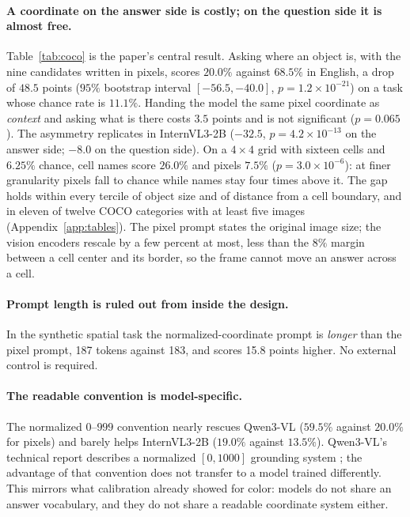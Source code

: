 \documentclass{article}
\begin{document}
\paragraph{A coordinate on the answer side is costly; on the question side it is
almost free.} Table~\ref{tab:coco} is the paper's central result. Asking where an
object is, with the nine candidates written in pixels, scores $20.0\%$ against
$68.5\%$ in English, a drop of $48.5$ points ($95\%$ bootstrap interval $[-56.5,
-40.0]$, $p=1.2\times10^{-21}$) on a task whose chance rate is $11.1\%$. Handing
the model the same pixel coordinate as \emph{context} and asking what is there
costs $3.5$ points and is not significant ($p=0.065$). The asymmetry replicates in
InternVL3-2B ($-32.5$, $p=4.2\times10^{-13}$ on the answer side; $-8.0$ on the
question side). On a $4\times4$ grid with sixteen cells and $6.25\%$ chance, cell
names score $26.0\%$ and pixels $7.5\%$ ($p=3.0\times10^{-6}$): at finer
granularity pixels fall to chance while names stay four times above it. The gap
holds within every tercile of object size and of distance from a cell boundary, and
in eleven of twelve COCO categories with at least five images
(Appendix~\ref{app:tables}). The pixel prompt states the original image size;
the vision encoders rescale by a few percent at most, less than the $8\%$ margin
between a cell center and its border, so the frame cannot move an answer across a
cell.

\paragraph{Prompt length is ruled out from inside the design.} In the synthetic
spatial task the normalized-coordinate prompt is \emph{longer} than the pixel
prompt, 187 tokens against 183, and scores 15.8 points higher. No external
control is required.

\paragraph{The readable convention is model-specific.} The normalized $0$--$999$
convention nearly rescues Qwen3-VL ($59.5\%$ against $20.0\%$ for pixels) and
barely helps InternVL3-2B ($19.0\%$ against $13.5\%$). Qwen3-VL's technical
report describes a normalized $[0,1000]$ grounding system \citep{qwen3vl2025};
the advantage of that convention does not transfer to a model trained differently.
This mirrors what calibration already showed for color: models do not share an
answer vocabulary, and they do not share a readable coordinate system either.
\end{document}
